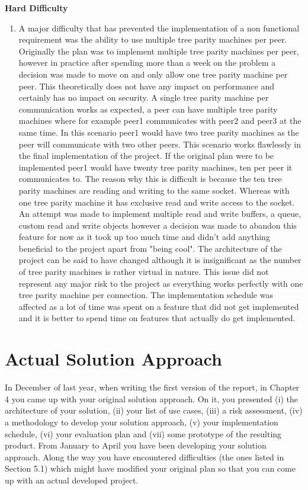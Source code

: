 \textbf{Hard Difficulty}
\begin{enumerate}
\item A major difficulty that has prevented the implementation of a non functional requirement was the ability to use multiple tree parity machines per peer. Originally the plan was to implement multiple tree parity machines per peer, however in practice after spending more than a week on the problem a decision was made to move on and only allow one tree parity machine per peer. This theoretically does not have any impact on performance and certainly has no impact on security. A single tree parity machine per communication works as expected, a peer can have multiple tree parity machines where for example peer1 communicates with peer2 and peer3 at the same time. In this scenario peer1 would have two tree parity machines as the peer will communicate with two other peers. This scenario works flawlessly in the final implementation of the project. If the original plan were to be implemented peer1 would have twenty tree parity machines, ten per peer it communicates to. The reason why this is difficult is because the ten tree parity machines are reading and writing to the same socket. Whereas with one tree parity machine it has exclusive read and write access to the socket. An attempt was made to implement multiple read and write buffers, a queue, custom read and write objects however a decision was made to abandon this feature for now as it took up too much time and didn't add anything beneficial to the project apart from "being cool". 
The architecture of the project can be said to have changed although it is insignificant as the number of tree parity machines is rather virtual in nature. This issue did not represent any major risk to the project as everything works perfectly with one tree parity machine per connection. The implementation schedule was affected as a lot of time was spent on a feature that did not get implemented and it is better to spend time on features that actually do get implemented.
\end{enumerate}



\section{Actual Solution Approach}
In December of last year, when writing the first version of the report, in Chapter 4 you came up with your original solution approach. On it, you presented (i) the architecture of your solution, (ii) your list of use cases, (iii) a risk assessment, (iv) a methodology to develop your solution approach, (v) your implementation schedule, (vi) your evaluation plan and (vii) some prototype of the resulting product. From January to April you have been developing your solution approach. Along the way you have encountered difficulties (the ones listed in Section 5.1) which might have modified your original plan so that you can come up with an actual developed project.

